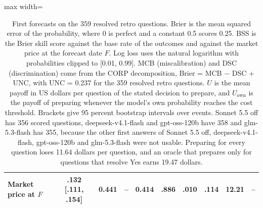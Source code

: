 \begin{table}[t]
\begin{adjustbox}{max width=\linewidth}
\begin{tabular}{lccccccccc}
\addlinespace
Market price at $F$ & .132 [.111, .154] & 0.441 & -- & 0.414 & .886 & .010 & .114 & 12.21 & -- \\
\bottomrule
\end{tabular}
\end{adjustbox}
\caption{First forecasts on the 359 resolved retro questions. Brier is the mean squared error of the probability, where 0 is perfect and a constant 0.5 scores 0.25. BSS is the Brier skill score against the base rate of the outcomes and against the market price at the forecast date $F$. Log loss uses the natural logarithm with probabilities clipped to [0.01, 0.99]. MCB (miscalibration) and DSC (discrimination) come from the CORP decomposition, Brier = MCB $-$ DSC + UNC, with UNC = 0.237 for the 359 resolved retro questions. $U$ is the mean payoff in US dollars per question of the stated decision to prepare, and $U_{\mathrm{own}}$ is the payoff of preparing whenever the model's own probability reaches the cost threshold. Brackets give 95 percent bootstrap intervals over events. Sonnet 5.5 off has 356 scored questions, deepseek-v4.1-flash and gpt-oss-120b have 358 and glm-5.3-flash has 355, because the other first answers of Sonnet 5.5 off, deepseek-v4.1-flash, gpt-oss-120b and glm-5.3-flash were not usable. Preparing for every question loses 11.64 dollars per question, and an oracle that prepares only for questions that resolve Yes earns 19.47 dollars.}
\label{tab:turn1}
\end{table}
